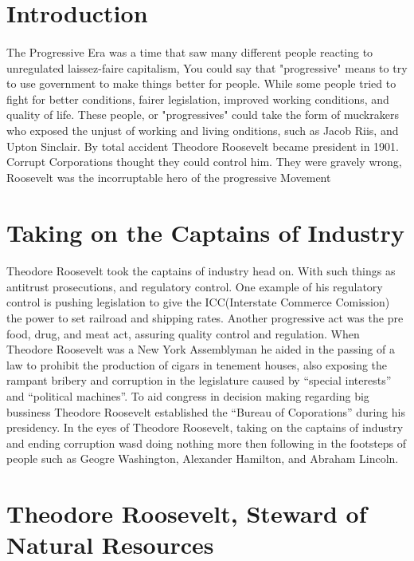 \section{Introduction}
\paragraph{}
The Progressive Era was a time that saw many different people reacting to
unregulated laissez-faire capitalism, You could say that "progressive"
means to try to use government to make things better for people.
While some people tried to fight for better conditions, fairer legislation,
improved working conditions, and quality of life. These people, or "progressives"
could take the form of muckrakers who exposed the unjust of working and living
onditions, such as Jacob Riis, and Upton Sinclair. By total accident Theodore
Roosevelt became president in 1901. Corrupt Corporations thought they could
control him. They were gravely wrong, Roosevelt was the incorruptable hero
of the progressive Movement

\section{Taking on the Captains of Industry}
\paragraph{}
Theodore Roosevelt took the captains of industry head on. With such things as
antitrust prosecutions, and regulatory control. One example of his regulatory
control is pushing legislation to give the ICC(Interstate Commerce Comission)
the power to set railroad and shipping rates. Another progressive act was the
pre food, drug, and meat act, assuring quality control and regulation. When
Theodore Roosevelt was a New York Assemblyman he aided in the passing of a law
to prohibit the production of cigars in tenement houses, also exposing the
rampant bribery and corruption in the legislature caused by
``special interests'' and ``political machines''. To aid congress in decision
making regarding big bussiness Theodore Roosevelt established the ``Bureau
of Coporations'' during his presidency. In the eyes of Theodore Roosevelt,
taking on the captains of industry and ending corruption wasd doing nothing
more then following in the footsteps of people such as Geogre Washington,
Alexander Hamilton, and Abraham Lincoln.

\section{Theodore Roosevelt, Steward of Natural Resources}
